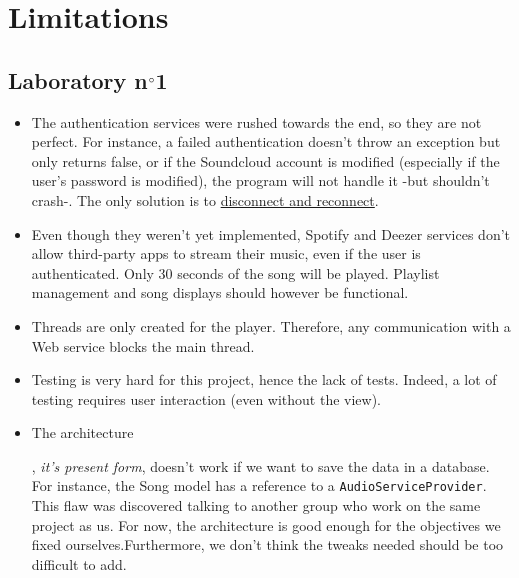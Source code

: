 \documentclass{report}
\begin{document}
\chapter{Limitations}

\section{Laboratory n$\degree$1}
\begin{itemize}
\item The authentication services were rushed towards the end, so they are not perfect. For instance, a failed authentication doesn't throw an exception but only returns false, or if the Soundcloud account is modified (especially if the user's password is modified), the program will not handle it -but shouldn't crash-. The only solution is to \href{http://img.pandawhale.com/post-16780-have-you-tried-forcing-an-unex-uQSY.gif}{disconnect and reconnect}. 
\item Even though they weren't yet implemented, Spotify and Deezer services don't allow third-party apps to stream their music, even if the user is authenticated. Only 30 seconds of the song will be played. Playlist management and song displays should however be functional.
\item Threads are only created for the player. Therefore, any communication with a Web service blocks the main thread.
\item Testing is very hard for this project, hence the lack of tests. Indeed, a lot of testing requires user interaction (even without the view).
\item \hypertarget{db}{The architecture}, \textit{it's present form}, doesn't work if we want to save the data in a database. For instance, the Song model has a reference to a \texttt{AudioServiceProvider}. This flaw was discovered talking to another group who work on the same project as us. For now, the architecture is good enough for the objectives we fixed ourselves.Furthermore, we don't think the tweaks needed should be too difficult to add.
\end{itemize}

\end{document}
